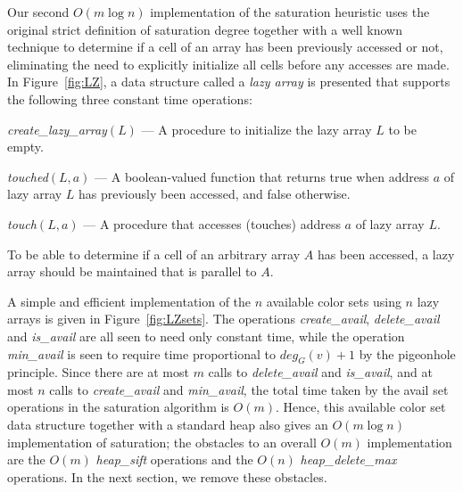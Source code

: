 Our second $O(m \log n)$ implementation of the saturation heuristic uses
the original strict definition of saturation degree together with a well known 
technique to determine if a cell of an array has been previously 
accessed or not, eliminating the need to explicitly initialize all cells 
before any accesses are made.  In Figure~\ref{fig:LZ}, a data structure 
called a {\em lazy array\/} is presented that supports the following 
three constant time operations:
\begin{list}{}
   {\setlength{\labelwidth}{1.75in}
    \setlength{\leftmargin}{1.75in}
    \setlength{\rightmargin}{0in}
    \setlength{\labelsep}{0in}
   }
\item[{\em create\_lazy\_array\/$(L)$}\hfill]	
--- A procedure to initialize the lazy array $L$ to be empty.
\item[{\em touched\/$(L, a)$}\hfill]
--- A boolean-valued function that returns true when
address $a$ of lazy array $L$ has previously been accessed, 
and false otherwise.
\item[{\em touch\/$(L, a)	$}\hfill]
--- A procedure that accesses (touches) address $a$ of lazy array $L$.
\end{list}
To be able to determine if a cell of an arbitrary array $A$ has been accessed, 
a lazy array should be maintained that is parallel to $A$.  

A simple and efficient implementation of the $n$ available color sets using 
$n$ lazy arrays is given in Figure~\ref{fig:LZsets}.  The operations 
{\em create\_avail}, {\em delete\_avail\/} and {\em is\_avail\/} are all 
seen to need only constant time, while the operation {\em min\_avail\/} is 
seen to require time proportional to $deg_G(v)+1$ by the pigeonhole principle.
Since there are at most $m$ calls to {\em delete\_avail\/} and 
{\em is\_avail}, and at most $n$ calls to {\em create\_avail\/} and 
{\em min\_avail}, the total time taken by the avail set operations in the 
saturation algorithm is $O(m)$.  Hence, this available color 
set data structure together with a standard heap also gives an 
$O(m \log n)$ implementation of saturation; the obstacles to an overall 
$O(m)$ implementation are the $O(m)$ {\em heap\_sift\/} operations and 
the $O(n)$ {\em heap\_delete\_max\/} operations.  In the next section, 
we remove these obstacles.


